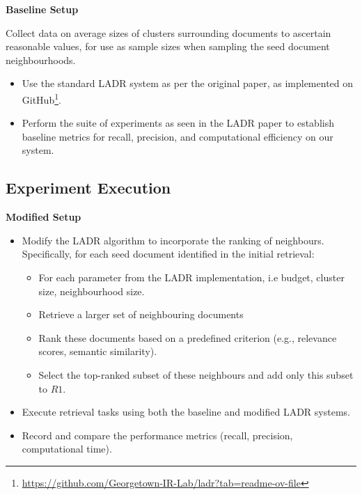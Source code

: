 \documentclass[sigconf,authorversion,nonacm]{acmart}
\begin{document}
\textbf{Baseline Setup}

Collect data on average sizes of clusters surrounding documents to ascertain reasonable values, for
use as sample sizes when sampling the seed document neighbourhoods.

\begin{itemize}

	\item Use the standard LADR system as per the original paper, as implemented
	      on GitHub\footnote{\url{https://github.com/Georgetown-IR-Lab/ladr?tab=readme-ov-file}}.

	\item Perform the suite of experiments as seen in the LADR paper to establish baseline metrics
	      for recall, precision, and computational efficiency on our system.

\end{itemize}

\subsection{Experiment Execution}
\textbf{Modified Setup}
\begin{itemize}
	\item Modify the LADR algorithm to incorporate the ranking of neighbours. Specifically, for each seed document identified in the initial retrieval:
	      \begin{itemize}
		      \item For each parameter from the LADR implementation, i.e budget, cluster size,
		            neighbourhood size.
		      \item Retrieve a larger set of neighbouring documents
		      \item Rank these documents based on a predefined criterion (e.g., relevance scores, semantic similarity).
		      \item Select the top-ranked subset of these neighbours and add only this subset to \( R1 \).
	      \end{itemize}
\end{itemize}

\begin{itemize}
	\item Execute retrieval tasks using both the baseline and modified LADR systems.
	\item Record and compare the performance metrics (recall, precision, computational time).
\end{itemize}
\end{document}
